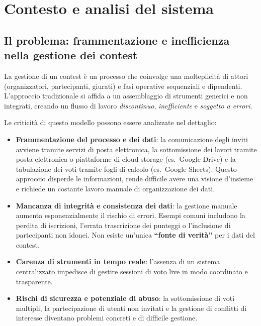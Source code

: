 
\chapter{Contesto e analisi del sistema}\label{ch:contesto-e-analisi-del-sistema}

\section{Il problema: frammentazione e inefficienza nella gestione dei contest}\label{sec:problema-frammentazione-inefficienza}
La gestione di un contest è un processo che coinvolge una molteplicità di attori (organizzatori, partecipanti, giurati) e fasi operative sequenziali e dipendenti.
L'approccio tradizionale si affida a un assemblaggio di strumenti generici e non integrati, creando un flusso di lavoro \emph{discontinuo}, \emph{inefficiente} e \emph{soggetto a errori}.

Le criticità di questo modello possono essere analizzate nel dettaglio:
\begin{itemize}
    \item \textbf{Frammentazione del processo e dei dati}: la comunicazione degli inviti avviene tramite servizi di posta elettronica, la sottomissione dei lavori tramite posta elettronica o piattaforme di cloud storage (es.\ Google Drive) e la tabulazione dei voti tramite fogli di calcolo (es.\ Google Sheets).
    Questo approccio disperde le informazioni, rende difficile avere una visione d'insieme e richiede un costante lavoro manuale di organizzazione dei dati.
    \item \textbf{Mancanza di integrità e consistenza dei dati}: la gestione manuale aumenta esponenzialmente il rischio di errori.
    Esempi comuni includono la perdita di iscrizioni, l'errata trascrizione dei punteggi o l'inclusione di partecipanti non idonei.
    Non esiste un'unica \textbf{``fonte di verità''} per i dati del contest.
    \item \textbf{Carenza di strumenti in tempo reale}: l'assenza di un sistema centralizzato impedisce di gestire sessioni di voto live in modo coordinato e trasparente.
    \item \textbf{Rischi di sicurezza e potenziale di abuso}: la sottomissione di voti multipli, la partecipazione di utenti non invitati e la gestione di conflitti di interesse diventano problemi concreti e di difficile gestione.
\end{itemize}

